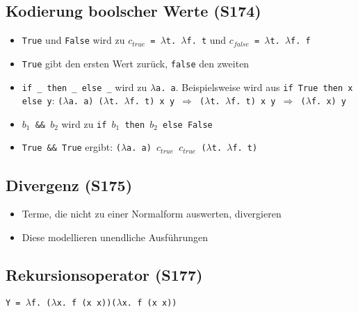 \subsection{Kodierung boolscher Werte (S174)}
\begin{itemize}
	\item \texttt{True} und \texttt{False} wird zu \texttt{\(c_{true}\) = \(\lambda\)t. \(\lambda\)f. t} und \texttt{\(c_{false}\) = \(\lambda\)t. \(\lambda\)f. f}
	\item \texttt{True} gibt den ersten Wert zurück, \texttt{false} den zweiten
	\item \texttt{if \_ then \_ else \_} wird zu \texttt{\(\lambda\)a. a}. Beispielsweise wird aus \texttt{if True then x else y}: \texttt{(\(\lambda\)a. a) (\(\lambda\)t. \(\lambda\)f. t) x y \(\Rightarrow\) (\(\lambda\)t. \(\lambda\)f. t) x y \(\Rightarrow\) (\(\lambda\)f. x) y}
	\item \texttt{\(b_1\) \&\& \(b_2\)} wird zu \texttt{if \(b_1\) then \(b_2\) else False}
	\item \texttt{True \&\& True} ergibt: \texttt{(\(\lambda\)a. a) \(c_{true}\) \(c_{true}\) (\(\lambda\)t. \(\lambda\)f. t)}
\end{itemize}


\subsection{Divergenz (S175)}
\begin{itemize}
	\item Terme, die nicht zu einer Normalform auswerten, divergieren
	\item Diese modellieren unendliche Ausführungen
\end{itemize}


\subsection{Rekursionsoperator (S177)}
\texttt{Y = \(\lambda\)f. (\(\lambda\)x. f (x x))(\(\lambda\)x. f (x x))}


